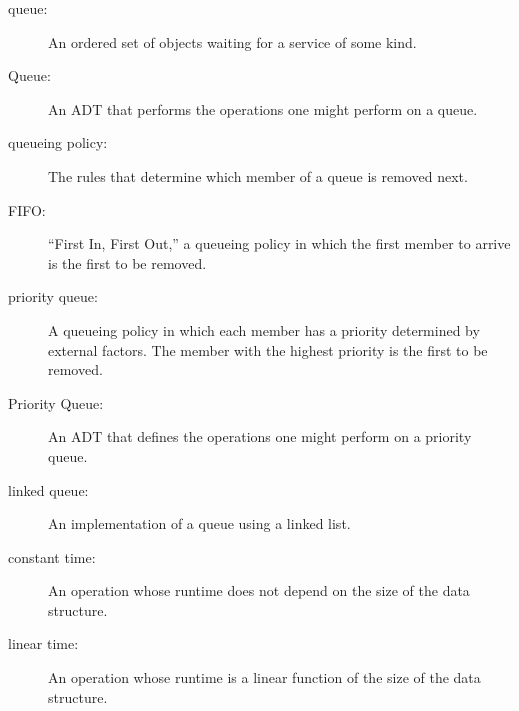 \begin{description}

\item[queue:]  An ordered set of objects waiting for a service of
some kind.

\item[Queue:]  An ADT that performs the operations one might perform
on a queue.

\item[queueing policy:]  The rules that determine which member
of a queue is removed next.

\item[FIFO:]  ``First In, First Out,'' a queueing policy in which
the first member to arrive is the first to be removed.

\item[priority queue:]  A queueing policy in which
each member has a priority determined by external factors.
The member with the highest priority is the first to be removed.

\item[Priority Queue:]  An ADT that defines the operations one
might perform on a priority queue.

\item[linked queue:]  An implementation of a queue using a linked
list.

\item[constant time:]  An operation whose runtime does not
depend on the size of the data structure.

\item[linear time:]  An operation whose runtime is a linear
function of the size of the data structure.

\end{description}
